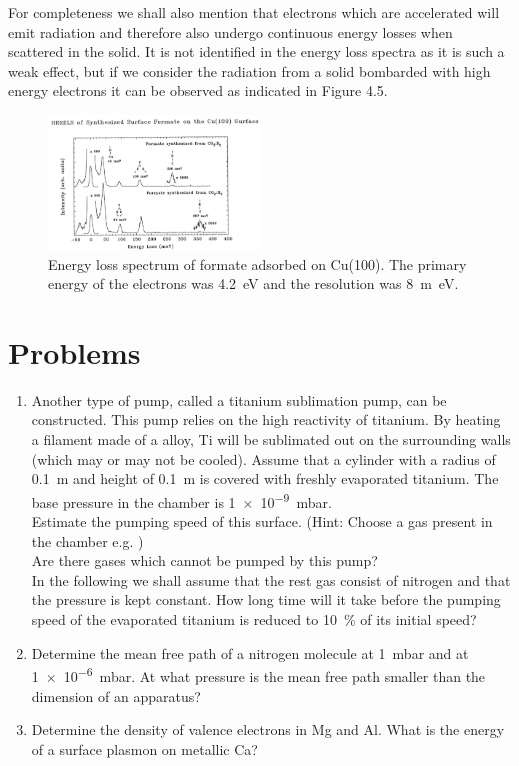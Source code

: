 For completeness we shall also mention that electrons which are accelerated will emit radiation \cite{Feynman} and therefore also undergo continuous energy losses when scattered in the solid. It is not identified in the energy loss spectra as it is such a weak effect, but if we consider the radiation from a solid bombarded with high energy electrons it can be observed as indicated in Figure 4.5.

\begin{figure}[htbp]
\centering
\includegraphics[width=0.5\textwidth]{figures/02_13}
\caption{Energy loss spectrum of formate adsorbed on Cu(100). The primary energy of the electrons was \SI{4.2}{\electronvolt} and the resolution was \SI{8}{m\electronvolt}.}
\label{fig:formate_spectrum}
\end{figure}

\section{Problems}
\begin{enumerate}
\item Another type of pump, called a titanium sublimation pump, can be constructed. This pump relies on the high reactivity of titanium. By heating a filament made of a  alloy, Ti will be sublimated out on the surrounding walls (which may or may not be cooled). Assume that a cylinder with a radius of \SI{.1}{m} and height of \SI{.1}{m} is covered with freshly evaporated titanium. The base pressure in the chamber is \SI{1e-9}{mbar}.\\

Estimate the pumping speed of this surface. (Hint: Choose a gas present in the chamber e.g. )\\

Are there gases which cannot be pumped by this pump?\\

In the following we shall assume that the rest gas consist of nitrogen and that the pressure is kept constant. How long time will it take before the pumping speed of the evaporated titanium is reduced to \SI{10}{\percent} of its initial speed?\\

\item Determine the mean free path of a nitrogen molecule at \SI{1}{mbar} and at \SI{1e-6}{mbar}. At what pressure is the mean free path smaller than the dimension of an apparatus?

\item Determine the density of valence electrons in Mg and Al. What is the energy of a surface plasmon on metallic Ca?
\end{enumerate}

